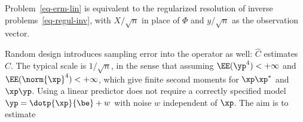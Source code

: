 Problem~\eqref{eq-erm-lin} is equivalent to the regularized resolution of inverse problems~\eqref{eq-regul-inv}, with $X/\sqrt n$ in place of $\Phi$ and $y/\sqrt n$ as the observation vector.
 
Random design introduces sampling error into the operator as well: $\hat C$ estimates $C$. The typical scale is $1/\sqrt{n}$, in the sense that
assuming $\EE(\yp^4)<+\infty$ and $\EE(\norm{\xp}^4)<+\infty$, which give finite second moments for $\xp\xp^*$ and $\xp\yp$. Using a linear predictor does not require a correctly specified model $\yp=\dotp{\xp}{\be} + w$ with noise $w$ independent of $\xp$. The aim is to estimate 